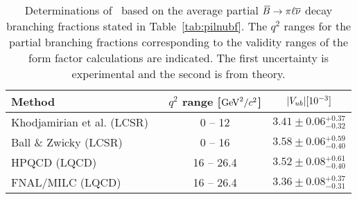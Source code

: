 
\begin{table}[hbtf]
\caption{\label{tab:pilnuvub}
Determinations of \vub\ based on the average partial
$\kern 0.18em\overline{\kern -0.18em B}{}\to\pi\ell\overline{\nu}$ decay branching fractions stated in
Table~\ref{tab:pilnubf}. 
The $q^2$ ranges for the partial branching fractions corresponding to the 
validity ranges of the form factor calculations are indicated. 
The first uncertainty is experimental and the second is from theory.  
}
\begin{center}
\renewcommand{\arraystretch}{1.2}
\begin{tabular}{|lcc|}
\hline
Method                                         & $q^2$ range [$\mathrm{Ge\kern -0.1em V}^2/c^2$] & $|V_{ub}| [10^{-3}]$ \\\hline\hline
Khodjamirian et al. (LCSR) ~\cite{Khodjamirian:2011ub} & 0 -- 12                    & $3.41\pm 0.06 {}^{+0.37}_{-0.32}$ \\ \hline
Ball \& Zwicky (LCSR)~\cite{Ball:2004ye}              & 0 -- 16                    & $3.58\pm 0.06 {}^{+0.59}_{-0.40}$ \\ \hline
HPQCD (LQCD)~\cite{Dalgic:2006dt}                     & 16 -- 26.4                 & $3.52\pm 0.08 {}^{+0.61}_{-0.40}$ \\  \hline
FNAL/MILC (LQCD)~\cite{Bailey:2008wp}                 & 16 -- 26.4                 & $3.36\pm 0.08 {}^{+0.37}_{-0.31}$ \\ 
\hline
\end{tabular}
\end{center}
\end{table}
